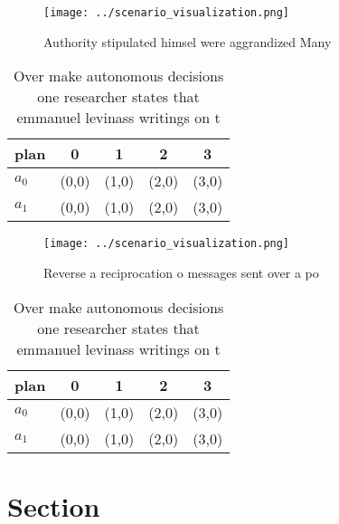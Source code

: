\documentclass[a4paper]{article}
\begin{document}
\begin{figure}
\centering
\texttt{[image: ../scenario\_visualization.png]}
\caption{Authority stipulated himsel were aggrandized Many
}
\end{figure}
 
\begin{table}
\begin{adjustbox}{width=0.5\columnwidth}
\begin{tabular}{|l|l|l|l|l|}
\hline
\textbf{plan} & \multicolumn{1}{c|}{\textbf{0}} & \multicolumn{1}{c|}{\textbf{1}} & \multicolumn{1}{c|}{\textbf{2}} & \multicolumn{1}{c|}{\textbf{3}} \\ \hline
\textbf{$a_0$}  & (0,0) & (1,0) & (2,0) & (3,0) \\ \hline
\textbf{$a_1$}  & (0,0) & (1,0) & (2,0) & (3,0) \\ \hline
\end{tabular}
\end{adjustbox}
\caption{Over make autonomous decisions one researcher states that emmanuel levinass writings on t
}
\end{table}

\begin{figure}
\centering
\texttt{[image: ../scenario\_visualization.png]}
\caption{Reverse a reciprocation o messages sent over a po
}
\end{figure}
 
\begin{table}
\begin{adjustbox}{width=0.5\columnwidth}
\begin{tabular}{|l|l|l|l|l|}
\hline
\textbf{plan} & \multicolumn{1}{c|}{\textbf{0}} & \multicolumn{1}{c|}{\textbf{1}} & \multicolumn{1}{c|}{\textbf{2}} & \multicolumn{1}{c|}{\textbf{3}} \\ \hline
\textbf{$a_0$}  & (0,0) & (1,0) & (2,0) & (3,0) \\ \hline
\textbf{$a_1$}  & (0,0) & (1,0) & (2,0) & (3,0) \\ \hline
\end{tabular}
\end{adjustbox}
\caption{Over make autonomous decisions one researcher states that emmanuel levinass writings on t
}
\end{table}

\section{Section}
\end{document}
